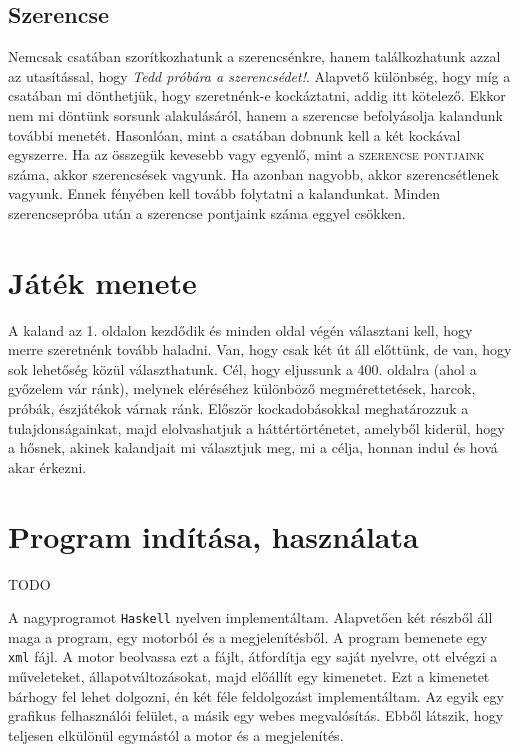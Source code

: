 \documentclass[12pt,a4paper,oneside]{report}
\newcommand{\stat}{\textsc}
\newcommand{\proglang}{\texttt}
\begin{document}
      \subsection{Szerencse}
        Nemcsak csatában szorítkozhatunk a szerencsénkre, hanem
        találkozhatunk azzal az utasítással, hogy \emph{Tedd próbára a
          szerencsédet!}. Alapvető különbség, hogy míg a csatában mi
        dönthetjük, hogy szeretnénk-e kockáztatni, addig itt
        kötelező. Ekkor nem mi döntünk sorsunk alakulásáról, hanem a
        szerencse befolyásolja kalandunk további menetét. Hasonlóan,
        mint a csatában dobnunk kell a két kockával egyszerre. Ha az
        összegük kevesebb vagy egyenlő, mint a \stat{szerencse
          pontjaink} száma, akkor szerencsések vagyunk. Ha azonban
        nagyobb, akkor szerencsétlenek vagyunk. Ennek fényében kell
        tovább folytatni a kalandunkat. Minden szerencsepróba után a
        szerencse pontjaink száma eggyel csökken.
    
      \section{Játék menete}
        A kaland az 1. oldalon kezdődik és minden oldal végén választani kell,
        hogy merre szeretnénk tovább haladni. Van, hogy csak két út áll
        előttünk, de van, hogy sok lehetőség közül választhatunk. Cél, hogy
        eljussunk a 400. oldalra (ahol a győzelem vár ránk), melynek eléréséhez
        különböző megmérettetések, harcok, próbák, észjátékok várnak ránk.
        Először kockadobásokkal meghatározzuk a tulajdonságainkat, majd
        elolvashatjuk a háttértörténetet, amelyből kiderül, hogy a hősnek,
        akinek kalandjait mi választjuk meg, mi a célja, honnan indul és
        hová akar érkezni.
    \section{Program indítása, használata}
      TODO
      
 A nagyprogramot \proglang{Haskell}
nyelven implementáltam. Alapvetően két részből áll maga a program, egy
motorból és a megjelenítésből. A program bemenete egy \proglang{xml}
fájl. A motor beolvassa ezt a fájlt, átfordítja egy saját nyelvre, ott
elvégzi a műveleteket, állapotváltozásokat, majd előállít egy
kimenetet. Ezt a kimenetet bárhogy fel lehet dolgozni, én két féle
feldolgozást implementáltam. Az egyik egy graf{}ikus felhasználói
felület, a másik egy webes megvalósítás. Ebből látszik, hogy teljesen
elkülönül egymástól a motor és a megjelenítés.
\end{document}
